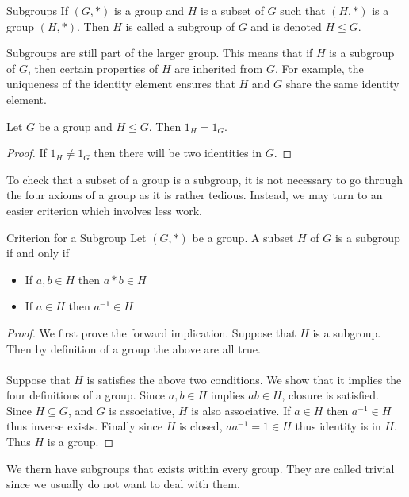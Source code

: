 \documentclass[a4paper]{article}
\begin{document}
\begin{defn}{Subgroups}{} If $(G,\ast)$ is a group and $H$ is a subset of $G$ such that $(H,\ast)$ is a group $(H,\ast)$. Then $H$ is called a subgroup of $G$ and is denoted $H\leq G$. 
\end{defn}

Subgroups are still part of the larger group. This means that if $H$ is a subgroup of $G$, then certain properties of $H$ are inherited from $G$. For example, the uniqueness of the identity element ensures that $H$ and $G$ share the same identity element. 

\begin{lmm}{}{} Let $G$ be a group and $H\leq G$. Then $1_H=1_G$. \tcbline
\begin{proof}
If $1_H\neq 1_G$ then there will be two identities in $G$. 
\end{proof}
\end{lmm}

To check that a subset of a group is a subgroup, it is not necessary to go through the four axioms of a group as it is rather tedious. Instead, we may turn to an easier criterion which involves less work. 

\begin{thm}{Criterion for a Subgroup}{} Let $(G,\ast)$ be a group. A subset $H$ of $G$ is a subgroup if and only if 
\begin{itemize}
\item If $a,b\in H$ then $a\ast b\in H$
\item If $a\in H$ then $a^{-1}\in H$
\end{itemize}\tcbline
\begin{proof} We first prove the forward implication. Suppose that $H$ is a subgroup. Then by definition of a group the above are all true.\\~\\
Suppose that $H$ is satisfies the above two conditions. We show that it implies the four definitions of a group. Since $a,b\in H$ implies $ab\in H$, closure is satisfied. Since $H\subseteq G$, and $G$ is associative, $H$ is also associative. If $a\in H$ then $a^{-1}\in H$ thus inverse exists. Finally since $H$ is closed, $aa^{-1}=1\in H$ thus identity is in $H$. Thus $H$ is a group. 
\end{proof}
\end{thm}

We thern have subgroups that exists within every group. They are called trivial since we usually do not want to deal with them. 
\end{document}
